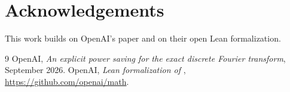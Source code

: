 \documentclass[11pt]{article}
\theoremstyle{definition}
\theoremstyle{remark}
\begin{document}
\section*{Acknowledgements}
This work builds on OpenAI's paper and on their open Lean formalization.

\begin{thebibliography}{9}
 OpenAI, \emph{An explicit power saving for the exact discrete Fourier transform},
  September 2026.
 OpenAI, \emph{Lean formalization of} \cite{oai}, \url{https://github.com/openai/math}.
\end{thebibliography}
\end{document}

